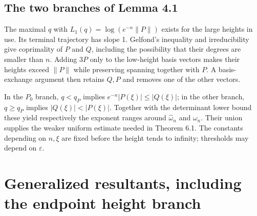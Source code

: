 \documentclass[10pt]{article}
\begin{document}
\subsection*{The two branches of Lemma 4.1}
The maximal \(q\) with \(L_1(q)=\log(e^{-n}\lVert P\rVert)\) exists for the large heights in use. Its terminal trajectory has slope 1. Gelfond’s inequality and irreducibility give coprimality of \(P\) and \(Q\), including the possibility that their degrees are smaller than \(n\). Adding \(3P\) only to the low-height basis vectors makes their heights exceed \(\lVert P\rVert\) while preserving spanning together with \(P\). A basis-exchange argument then retains \(Q,P\) and removes one of the other vectors.\par
In the \(P_0\) branch, \(q<q_P\) implies \(e^{-n}|P(\xi)|\le|Q(\xi)|\); in the other branch, \(q\ge q_P\) implies \(|Q(\xi)|<|P(\xi)|\). Together with the determinant lower bound these yield respectively the exponent ranges around \(\widehat\omega_n\) and \(\omega_n\). Their union supplies the weaker uniform estimate needed in Theorem 6.1. The constants depending on \(n,\xi\) are fixed before the height tends to infinity; thresholds may depend on \(\varepsilon\).\par
\section*{Generalized resultants, including the endpoint height branch}
\end{document}

